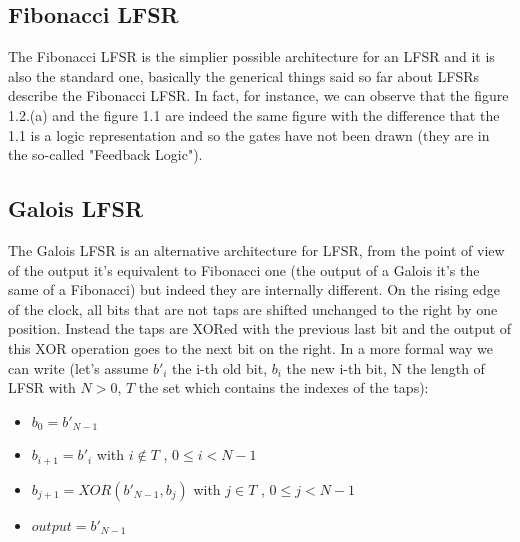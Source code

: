 \documentclass[a4paper]{report}
\begin{document}
\subsection{Fibonacci LFSR}
The Fibonacci LFSR is the simplier possible architecture for an LFSR  and it is also the standard one, basically the generical things said so far about LFSRs describe the Fibonacci LFSR. In fact, for instance, we can observe that the figure 1.2.(a) and the figure 1.1 are indeed the same figure with the difference that the 1.1 is a logic representation and so the gates have not been drawn (they are in the so-called "Feedback Logic").
\subsection{Galois LFSR}
The Galois LFSR is an alternative architecture for LFSR, from the point of view of the output it's equivalent to Fibonacci one (the output of a Galois it's the same of a Fibonacci) but indeed they are internally different. On the rising edge of the clock, all bits that are not taps are shifted unchanged to the right by one position. Instead the taps are XORed with the previous last bit and the output of this XOR operation goes to the next bit on the right. In a more formal way we can write (let's assume $b'_i$ the i-th old bit, $b_i$ the new i-th bit, N the length of LFSR with $N>0$, $T$ the set which contains the indexes of the taps):
\begin{itemize}
	\item $b_0 = b'_{N-1}$
	\item $b_{i+1} = b'_i$ with $i\notin T$ , $0\le i < N-1$
	\item $b_{j+1} = XOR(b'_{N-1} , b_j)$ with $j \in T$ , $0\le j < N-1$
	\item $output = b'_{N-1}$
\end{itemize}
\end{document}
